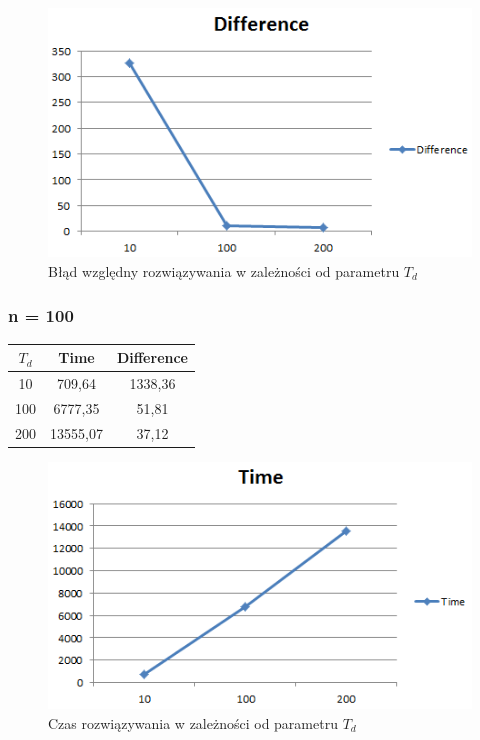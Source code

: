 \documentclass[wide,a4paper,titlepage,12pt] {article}
\begin{document}
\begin{figure}[htbp]
  \begin{center}
         \includegraphics[scale=0.8]{charts/diff50.PNG}
         \caption{Błąd względny rozwiązywania w zależności od parametru $T_d$}
  \end{center}
\end{figure}

\newpage
\subsubsection{n = 100}
\begin{center}
    \begin{tabular}{|c|c|c|}
      \hline
       $T_{d}$ & Time & Difference \\ \hline
          10&    709,64 & 1338,36\\ \hline
            100 &6777,35 &51,81\\ \hline
            200 &13555,07 &   37,12\\ \hline

  \end{tabular}
\end{center}

\begin{figure}[htbp]
  \begin{center}
         \includegraphics[scale=0.8]{charts/time100.PNG}
         \caption{Czas rozwiązywania w zależności od parametru $T_d$}
  \end{center}
\end{figure}
\end{document}
